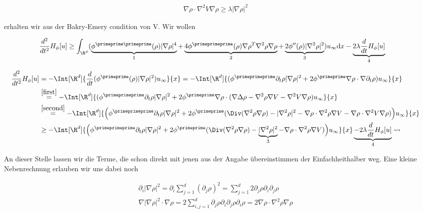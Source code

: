 \begin{solution}
\begin{enumerate}[label = (\roman*)]
  \begin{align*}
    \nabla \rho \cdot \nabla^2 V \nabla \rho
    \geq
    \lambda |\nabla \rho|^2
  \end{align*}

  erhalten wir aus der Bakry-Emery condition von V. Wir wollen

  \begin{align*}
    \frac{d^2}{d t^2} H_{\phi}[u] &\geq
    \int_{\R^d}(
    \underbrace{
    \phi^{\primeprime \primeprime}(\rho)|\nabla \rho|^4
    }_{1}
    +
    \underbrace{
    4\phi^\primeprimeprime(\rho) \nabla \rho^{T} \nabla^2 \rho \nabla \rho
    }_{2}
    +
    \underbrace{
    2\phi^{\prime \prime}(\rho)|\nabla^{2} \rho|^2
    }_{3}
    ) u_{\infty} \mathrm{d} x
    -\underbrace{
    2 \lambda \frac{d}{d t} H_{\phi}[u]
    }_{4}
    \end{align*}

  \begin{align*}
    \frac{d^2}{dt^2}H_\phi[u]
    &=
    -\Int[\R^d]{\frac{d}{dt}(\phi^\primeprime(\rho) |\nabla \rho|^2) u_\infty}{x}
    =
    -\Int[\R^d]{(\phi^\primeprimeprime \partial_t\rho |\nabla \rho|^2 + 2\phi^\primeprime \nabla \rho \cdot \nabla \partial_t \rho) u_\infty}{x} \\
    &\stackrel{\ref{first}}{=}
    -\Int[\R^d]{
    (\phi^\primeprimeprime \partial_t\rho |\nabla \rho|^2 +2 \phi^\primeprime \nabla \rho \cdot (\nabla \Delta \rho - \nabla^2 \rho \nabla V - \nabla^2V \nabla \rho)u_\infty
    }{x} \\
    &\stackrel{\ref{second}}{=}
    -\Int[\R^d]{
    \Big(\phi^\primeprimeprime
    \partial_t\rho
    |\nabla \rho|^2
    +
    2 \phi^\primeprime(
    \Div(\nabla^2 \rho \nabla \rho) - |\nabla^2 \rho|^2
    -
    \nabla \rho \cdot \nabla^2 \rho \nabla V
    -
    \nabla \rho \cdot\nabla^2V \nabla \rho)\Big)u_\infty
    }{x}\\
    &\geq
    -\Int[\R^d]{
    \Big(\phi^\primeprimeprime
    \partial_t\rho
    |\nabla \rho|^2
    +
    2 \phi^\primeprime(
    \Div(\nabla^2 \rho \nabla \rho) - \underbrace{|\nabla^2 \rho|^2}_{3}
    -
    \nabla \rho \cdot \nabla^2 \rho \nabla V)\Big)u_\infty}{x}
    \underbrace{-2 \lambda \frac{d}{dt} H_\phi[u]}_{4}
    \rightsquigarrow
  \end{align*}

  An dieser Stelle lassen wir die Terme, die schon direkt mit jenen aus der Angabe übereinstimmen der Einfachheithalber weg. Eine kleine Nebenrechnung erlauben wir uns dabei noch

  \begin{align}
    \partial_i |\nabla \rho|^2
    =
    \partial_i \sum_{j=1}^d (\partial_j \rho)^2
    =
    \sum_{j=1}^d 2 \partial_j \rho \partial_i \partial_j \rho
    \\ \label{third}
    \nabla |\nabla \rho|^2 \cdot \nabla \rho
    =
    2\sum_{i,j=1}^d \partial_j \rho \partial_i \partial_j \rho \partial_i \rho
    =
    2 \nabla \rho \cdot \nabla^2\rho \nabla \rho
  \end{align}


\end{enumerate}
\end{solution}
